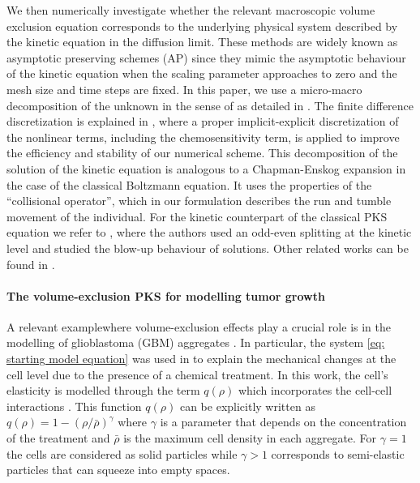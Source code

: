 \documentclass[review,onefignum,onetabnum]{siamart220329}
\newcommand{\XR} {\color{red}}
\begin{document}
We then numerically investigate whether the relevant macroscopic volume exclusion equation corresponds to the underlying physical system described by the kinetic equation { in the diffusion limit}. These methods are widely known as asymptotic preserving schemes (AP) \cite{filbet2010class,jin1999efficient} since they mimic the asymptotic behaviour of the kinetic equation when the scaling parameter approaches to zero and the mesh size and time steps are fixed. In this paper, we use a micro-macro decomposition of the unknown in the sense of  \cite{LemouMieussens} as detailed in . {The finite difference discretization is explained in , where a proper implicit-explicit discretization of the nonlinear terms, including the chemosensitivity term, is applied to improve the efficiency and stability of our numerical scheme.} This decomposition of the solution of the kinetic equation is analogous to a Chapman-Enskog expansion in the case of the classical Boltzmann equation. It uses the properties of the ``collisional operator'', which in our formulation describes the run and tumble movement of the individual. For the kinetic counterpart of the classical PKS equation we refer to \cite{carrillo2013asymptotic}, where the authors used an odd-even splitting at the kinetic level and studied {\XR the blow-up behaviour of solutions.}
Other related works can be found in \cite{emako2016well,wang2019asymptotic,jin2011class,chertock2019high}. 

\paragraph{The volume-exclusion PKS for modelling tumor growth} A relevant example\newline  where volume-exclusion effects play a crucial role is in the modelling of glioblastoma (GBM) aggregates  \cite{Vital2011}. In particular, the  system \cref{eq: starting model equation} was used in \cite{almeida2020treatment} to explain the mechanical changes at the cell level  due to the presence of a chemical treatment. %
In this work, the cell's elasticity is modelled through the term $q(\rho)$ which incorporates the cell-cell interactions \cite{wang2007classical}. This function $q(\rho)$ can be explicitly written as $q(\rho)=1-(\rho/\bar{\rho})^\gamma$ where $\gamma$ is a parameter that depends on the concentration of the treatment and $\bar{\rho}$ is the maximum cell density in each aggregate. For $\gamma=1$ the cells are considered as solid particles while {$\gamma>1$  corresponds to semi-elastic particles} that can squeeze into empty spaces.
\end{document}
